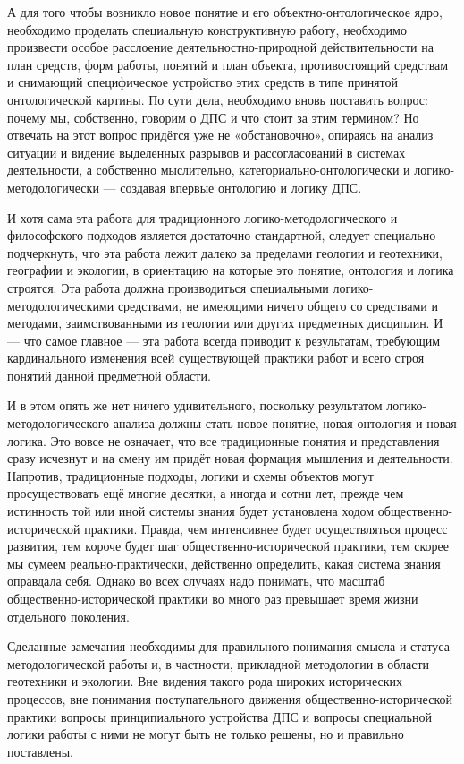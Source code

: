 \documentclass[11pt,a4paper]{article}
\begin{document}
А для того чтобы возникло новое понятие и его объектно-онтологическое ядро,
необходимо проделать специальную конструктивную работу, необходимо произвести
особое расслоение деятельностно-природной действительности на план средств,
форм работы, понятий и план объекта, противостоящий средствам и снимающий
специфическое устройство этих средств в типе принятой онтологической картины.
По сути дела, необходимо вновь поставить вопрос: почему мы, собственно,
говорим о ДПС и что стоит за этим термином? Но отвечать на этот вопрос
придётся уже не «обстановочно», опираясь на анализ ситуации и видение
выделенных разрывов и рассогласований в системах деятельности, а собственно
мыслительно, категориально-онтологически и логико-методологически — создавая
впервые онтологию и логику ДПС.

И хотя сама эта работа для традиционного логико-методологического и
философского подходов является достаточно стандартной, следует специально
подчеркнуть, что эта работа лежит далеко за пределами геологии и геотехники,
географии и экологии, в ориентацию на которые это понятие, онтология и логика
строятся. Эта работа должна производиться специальными
логико-методологическими средствами, не имеющими ничего общего со средствами и
методами, заимствованными из геологии или других предметных дисциплин. И — что
самое главное — эта работа всегда приводит к результатам, требующим
кардинального изменения всей существующей практики работ и всего строя понятий
данной предметной области. 

И в этом опять же нет ничего удивительного, поскольку результатом
логико-методологи\-ческого анализа должны стать новое понятие, новая онтология
и новая логика. Это вовсе не означает, что все традиционные понятия и
представления сразу исчезнут и на смену им придёт новая формация мышления и
деятельности. Напротив, традиционные подходы, логики и схемы объектов могут
просуществовать ещё многие десятки, а иногда и сотни лет, прежде чем
истинность той или иной системы знания будет установлена ходом
общественно-исторической практики. Правда, чем интенсивнее будет
осуществляться процесс развития, тем короче будет шаг общественно-исторической
практики, тем скорее мы сумеем реально-практически, действенно определить,
какая система знания оправдала себя. Однако во всех случаях надо понимать, что
масштаб общественно-исторической практики во много раз превышает время жизни
отдельного поколения.

Сделанные замечания необходимы для правильного понимания смысла и статуса
методологической работы и, в частности, прикладной методологии в области
геотехники и экологии. Вне видения такого рода широких исторических процессов,
вне понимания поступательного движения общественно-исторической практики
вопросы принципиального устройства ДПС и вопросы специальной логики работы с
ними не могут быть не только решены, но и правильно поставлены. 
\end{document}
